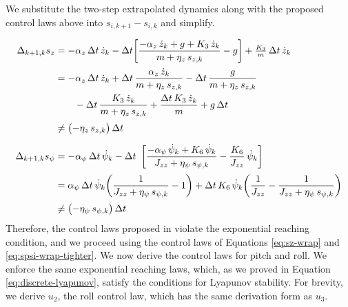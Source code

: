 \documentclass[conf]{new-aiaa}
\begin{document}
We substitute the two-step extrapolated dynamics along with the proposed control laws above into $s_{i,k+1} - s_{i,k}$ and simplify.

\begingroup
\small
\setlength{\jot}{0.5pt}
\begin{align}
\Delta_{k+1,k}s_{z}
&= -\alpha_z\,\Delta t\,\dot z_k - \Delta t\!\left[ \frac{-\alpha_z\,\dot z_k + g + K_3\,\dot z_k}{m + \eta_z\,s_{z,k}} - g \right] + \tfrac{K_3}{m}\,\Delta t\,\dot z_k \notag \\[2pt]
&= -\alpha_z\,\Delta t\,\dot z_k + \Delta t\,\frac{\alpha_z\,\dot z_k}{m+\eta_z\,s_{z,k}} - \Delta t\,\frac{g}{m+\eta_z\,s_{z,k}} \notag \\
&\qquad - \Delta t\,\frac{K_3\,\dot z_k}{m+\eta_z\,s_{z,k}} + \frac{\Delta t\,K_3\,\dot z_k}{m} + g\,\Delta t \notag \\[2pt]
&\neq \bigl(-\eta_z\,s_{z,k}\bigr)\,\Delta t \\[6pt]
\Delta_{k+1,k}s_{\psi}
&= -\alpha_\psi\,\Delta t\,\dot\psi_k - \Delta t\ \left[ \frac{-\alpha_\psi\,\dot\psi_k + K_6\,\dot\psi_k}{J_{zz} + \eta_\psi\,s_{\psi,k}} - \frac{K_6}{J_{zz}}\,\dot\psi_k \right] \notag \\[2pt]
&= \alpha_\psi\,\Delta t\,\dot\psi_k\!\left(\frac{1}{J_{zz}+\eta_\psi\,s_{\psi,k}} - 1\right) + \Delta t\,K_6\,\dot\psi_k\!\left(\frac{1}{J_{zz}} - \frac{1}{J_{zz}+\eta_\psi\,s_{\psi,k}}\right) \notag \\[2pt]
&\neq \bigl(-\eta_\psi\,s_{\psi,k}\bigr)\,\Delta t
\end{align}
\endgroup
Therefore, the control laws proposed in \cite{refs:Xiong2016} violate the exponential reaching condition, and we proceed using the control laws of Equations \ref{eq:sz-wrap} and \ref{eq:spsi-wrap-tighter}. We now derive the control laws for pitch and roll. We enforce the same exponential reaching laws, which, as we proved in Equation \ref{eq:discrete-lyapunov}, satisfy the conditions for Lyapunov stability. For brevity, we derive $u_2$, the roll control law, which has the same derivation form as $u_3$.
\end{document}
